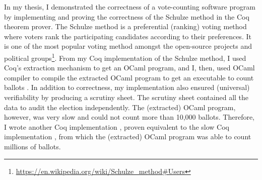 \documentclass[a4paper]{article}
\begin{document}
In my thesis, I demonstrated the correctness of a vote-counting software program 
by implementing and proving the correctness of the Schulze method \cite{10.1007/978-3-319-66107-0_26} in the Coq theorem 
prover. 
The Schulze method is a preferential (ranking) voting method where voters rank the participating 
candidates according to their preferences. It is one of the most popular voting method amongst the open-source projects and 
political groups\footnote{\url{https://en.wikipedia.org/wiki/Schulze_method#Users}}.
From my Coq implementation of the Schulze method,
I used Coq's extraction mechanism to get an OCaml program, and 
I, then, used OCaml compiler to compile the extracted OCaml program to get an executable  
to count ballots \cite{10.1007/978-3-319-66107-0_26}.
In addition to correctness, my implementation also
ensured (universal) verifiability by producing a scrutiny sheet. The scrutiny sheet contained all 
the data to audit the election independently. The (extracted) OCaml program, however, was 
very slow and could not count more than 10,000 ballots. Therefore, I wrote another 
Coq implementation \cite{bennett2017no}, proven equivalent to the slow Coq 
implementation  \cite{10.1007/978-3-319-66107-0_26}, from which the (extracted) 
OCaml program was able to count millions of ballots.
\end{document}
